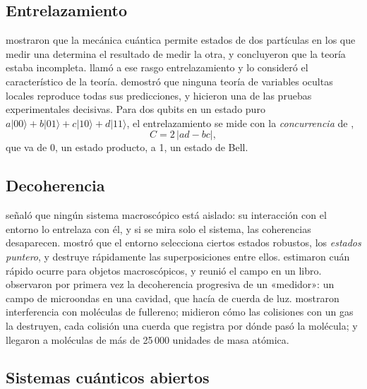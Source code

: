 \documentclass[11pt,a4paper]{article}
\begin{document}
\subsection{Entrelazamiento}

\textcite{einstein1935} mostraron que la mecánica cuántica permite estados de dos partículas en los que medir una determina el resultado de medir la otra, y concluyeron que la teoría estaba incompleta. \textcite{schrodinger1935b} llamó a ese rasgo entrelazamiento y lo consideró el característico de la teoría. \textcite{bell1964} demostró que ninguna teoría de variables ocultas locales reproduce todas sus predicciones, y \textcite{aspect1982} hicieron una de las pruebas experimentales decisivas. Para dos qubits en un estado puro $a|00\rangle + b|01\rangle + c|10\rangle + d|11\rangle$, el entrelazamiento se mide con la \emph{concurrencia} de \textcite{wootters1998},
\begin{equation}\label{eq:concurrencia}
C = 2\,|ad - bc| ,
\end{equation}
que va de 0, un estado producto, a 1, un estado de Bell.

\subsection{Decoherencia}

\textcite{zeh1970} señaló que ningún sistema macroscópico está aislado: su interacción con el entorno lo entrelaza con él, y si se mira solo el sistema, las coherencias desaparecen. \textcite{zurek1981,zurek2003} mostró que el entorno selecciona ciertos estados robustos, los \emph{estados puntero}, y destruye rápidamente las superposiciones entre ellos. \textcite{joos1985} estimaron cuán rápido ocurre para objetos macroscópicos, y \textcite{schlosshauer2007} reunió el campo en un libro. \textcite{brune1996} observaron por primera vez la decoherencia progresiva de un «medidor»: un campo de microondas en una cavidad, que hacía de cuerda de luz. \textcite{arndt1999} mostraron interferencia con moléculas de fullereno; \textcite{hornberger2003} midieron cómo las colisiones con un gas la destruyen, cada colisión una cuerda que registra por dónde pasó la molécula; y \textcite{fein2019} llegaron a moléculas de más de 25\,000 unidades de masa atómica.

\subsection{Sistemas cuánticos abiertos}
\end{document}

